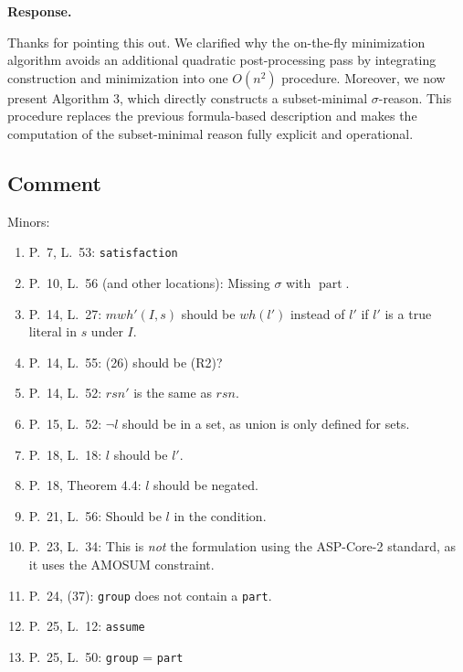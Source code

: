 \documentclass[11pt]{article}
\theoremstyle{definition}
\newcommand{\revieweranswered}{\subsection{Comment}}
\newenvironment{response}{
    \color{blue} \textbf{Response.}
}{
}
\begin{document}
\begin{response}
Thanks for pointing this out.
We clarified why the on-the-fly minimization algorithm avoids an additional quadratic post-processing pass by integrating construction and minimization into one $O(n^2)$ procedure.
Moreover, we now present Algorithm 3, which directly constructs a subset-minimal \(\sigma\)-reason. This procedure replaces the previous formula-based description and makes the computation of the subset-minimal reason fully explicit and operational.
\end{response}

\vspace{0.5cm}
\revieweranswered 
Minors:
\begin{enumerate}
    \item P.~7, L.~53: \texttt{satisfaction}
    \item P.~10, L.~56 (and other locations): Missing $\sigma$ with $\operatorname{part}$.
    \item P.~14, L.~27: $mwh'(I,s)$ should be $wh(l')$ instead of $l'$ if $l'$ is a true literal in $s$ under $I$.
    \item P.~14, L.~55: (26) should be (R2)?
    \item P.~14, L.~52: $rsn'$ is the same as $rsn$.
    \item P.~15, L.~52: $\neg l$ should be in a set, as union is only defined for sets.
    \item P.~18, L.~18: $l$ should be $l'$.
    \item P.~18, Theorem 4.4: $l$ should be negated.
    \item P.~21, L.~56: Should be $l$ in the condition.
    \item P.~23, L.~34: This is \emph{not} the formulation using the ASP-Core-2 standard, as it uses the AMOSUM constraint.
    \item P.~24, (37): \texttt{group} does not contain a \texttt{part}.
    \item P.~25, L.~12: \texttt{assume}
    \item P.~25, L.~50: \texttt{group} = \texttt{part}
\end{enumerate}
\end{document}
